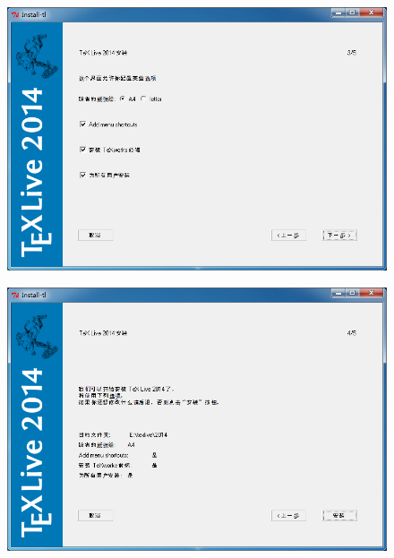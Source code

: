 \documentclass[xcolor=table,dvipsnames,svgnames]{beamer}
\begin{document}
\begin{frame}
  \begin{figure}[h]
  \centering
\includegraphics[scale=0.5]{simple5-opt.png}
  \end{figure}
\end{frame}


\begin{frame}
  \begin{figure}[h]
  \centering
\includegraphics[scale=0.5]{simple6-preinstall.png}
  \end{figure}
\end{frame}
\end{document}
